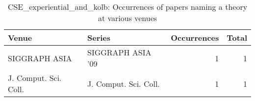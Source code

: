 \begin{table*}[t]
\begin{tabular}{llrr}
Venue & Series & Occurrences & Total\\\hline
\multirow{1}{*}{SIGGRAPH ASIA } & SIGGRAPH ASIA '09 & 1 & \multirow{1}{*}{1}\\
\multirow{1}{*}{J. Comput. Sci. Coll.} & J. Comput. Sci. Coll. & 1 & \multirow{1}{*}{1}\\
\end{tabular}
\caption{CSE\_experiential\_and\_kolb: Occurrences of papers naming a theory at various venues}
\end{table*}